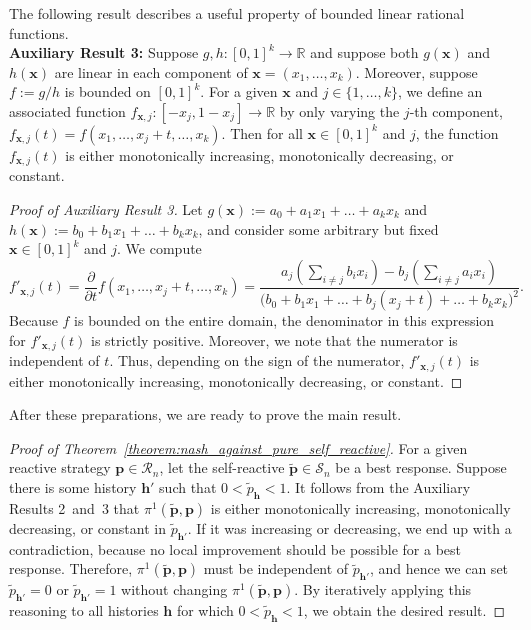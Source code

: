 \documentclass[9pt,twoside,lineno]{pnas-new}
\theoremstyle{plainCl1}
\theoremstyle{plainCl2}
\begin{document}
\noindent
The following result describes a useful property of bounded linear rational functions.\\

\noindent
{\bf Auxiliary Result 3:} Suppose $g,h:[0,1]^{k}\!\rightarrow\! \mathbb{R}$ and suppose both $g(\mathbf{x})$ and $h(\mathbf{x})$ are linear in each component of $\mathbf{x}\!=\!(x_1,\ldots,x_k)$. 
Moreover, suppose $f\!:=\!g/h$ is bounded on $[0,1]^{k}$. 
For a given $\mathbf{x}$ and $j\!\in\!\{1,\ldots,k\}$, we define an associated function $f_{\mathbf{x},j}:[-x_j,1\!-\!x_j]\to\mathbb{R}$ by only varying the $j$-th component, $f_{\mathbf{x},j}(t) = f(x_1,\ldots,x_j+t,\ldots,x_k)$. Then for all $\mathbf{x}\!\in\![0,1]^k$ and $j$, the function  $f_{\mathbf{x},j}(t)$ is either monotonically increasing, monotonically decreasing, or constant.

\begin{proof}[Proof of Auxiliary Result 3]
Let $g(\mathbf{x}):=a_0\!+\!a_1x_1\!+\!\ldots \!+\!a_k x_k$ and $h(\mathbf{x}):=b_0\!+\!b_1x_1\!+\!\ldots \!+\!b_k x_k$, and consider some arbitrary but fixed $\mathbf{x}\!\in\![0,1]^k$ and $j$. We compute
\begin{equation}
f'_{\mathbf{x},j}(t) = \frac{\partial}{\partial t}  f(x_1,\ldots,x_j+t,\ldots,x_k) = \frac{a_j\left( \sum_{i\neq j} b_i x_i\right) - b_j \left(\sum_{i\neq j} a_i x_i\right)}{\big(b_0+b_1x_1+\ldots+b_j(x_j+t)+\ldots+b_kx_k\big)^2}.
\end{equation}
Because $f$ is bounded on the entire domain, the denominator in this expression for $f'_{\mathbf{x},j}(t)$ is strictly positive. Moreover, we note that the numerator is independent of $t$. Thus, depending on the sign of the numerator, $f'_{\mathbf{x},j}(t)$ is either monotonically increasing, monotonically decreasing, or constant. 
\end{proof}

\noindent
After these preparations, we are ready to prove the main result. 

\begin{proof}[Proof of Theorem~\ref{theorem:nash_against_pure_self_reactive}]
For a given reactive strategy $\mathbf{p}\!\in\!\mathcal{R}_n$, let the self-reactive $\mathbf{\tilde p}\!\in\!\mathcal{S}_n$ be a best response. Suppose there is some history $\mathbf{h'}$ such that $0\!<\!\tilde p_\mathbf{h}\!<\!1$. It follows from the Auxiliary Results 2~and~3 that $\pi^1(\mathbf{\tilde p},\mathbf{p})$ is either monotonically increasing, monotonically decreasing, or constant in $\tilde p_\mathbf{h'}$. 
If it was increasing or decreasing, we end up with a contradiction, because no local improvement should be possible for a best response. 
Therefore, $\pi^1(\mathbf{\tilde p},\mathbf{p})$  must be independent of $\tilde p_\mathbf{h'}$, and hence we can set 
$\tilde p_\mathbf{h'}\!=\!0$ or $\tilde p_\mathbf{h'}\!=\!1$ without changing $\pi^1(\mathbf{\tilde p},\mathbf{p})$. By iteratively applying this reasoning to all histories $\mathbf{h}$ for which $0\!<\!\tilde p_\mathbf{h}\!<\!1$, we obtain the desired result. 
\end{proof}
~
\end{document}

